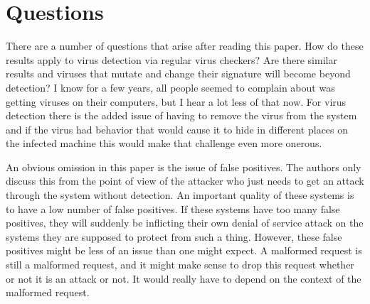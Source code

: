 \documentclass{reading_glasses}
\begin{document}
\section{Questions}
There are a number of questions that arise after reading this paper.  How do these results apply to virus detection via regular virus checkers?  Are there similar results and viruses that mutate and change their signature will become beyond detection?  I know for a few years, all people seemed to complain about was getting viruses on their computers, but I hear a lot less of that now.  For virus detection there is the added issue of having to remove the virus from the system and if the virus had behavior that would cause it to hide in different places on the infected machine this would make that challenge even more onerous.  

An obvious omission in this paper is the issue of false positives.  The authors only discuss this from the point of view of the attacker who just needs to get an attack through the system without detection.  An important quality of these systems is to have a low number of false positives.  If these systems have too many false positives, they will suddenly be inflicting their own denial of service attack on the systems they are supposed to protect from such a thing.  However, these false positives might be less of an issue than one might expect.  A malformed request is still a malformed request, and it might make sense to drop this request whether or not it is an attack or not.  It would really have to depend on the context of the malformed request.




\end{document}

